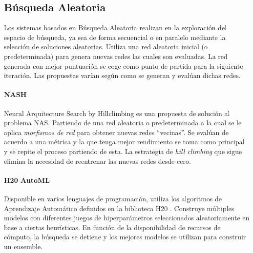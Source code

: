 \subsection{B\'usqueda Aleatoria}
Los sistemas basados en B\'usqueda Aleatoria realizan en la exploraci\'on del espacio de b\'usqueda, ya sea de forma secuencial o en paralelo mediante la selecci\'on de soluciones aleatorias. Utiliza una red aleatoria inicial (o predeterminada) para genera nuevas redes las cuales son evaluadas. La red generada con mejor puntuaci\'on se coge como punto de partida para la siguiente iteraci\'on. Las propuestas var\'ian seg\'un como se generan y eval\'uan dichas redes. 

        \paragraph{NASH } Neural Arquitecture Search by Hillclimbing es una propuesta de soluci\'on al problema NAS.
Partiendo de una red aleatoria o predeterminada a la cual se le aplica \textit{morfismos de red} para obtener  nuevas redes ``vecinas''. Se eval\'uan de acuerdo a una  m\'etrica y la que tenga mejor rendimiento se toma como principal y se repite el proceso partiendo de esta. La estrategia de \textit{hill climbing} que sigue elimina la necesidad de reentrenar las nuevas redes desde cero.

        \paragraph{H20 AutoML } Disponible en varios lenguajes de programaci\'on, utiliza los algoritmos de Aprendizaje Autom\'atico definidos en la biblioteca H20 . Construye m\'ultiples modelos con diferentes juegos de hiperpar\'ametros seleccionados aleatoriamente en base a ciertas heur\'isticas. En funci\'on de la disponibilidad de recursos de c\'omputo, la b\'usqueda se detiene y los mejores modelos se utilizan para construir un ensemble.

